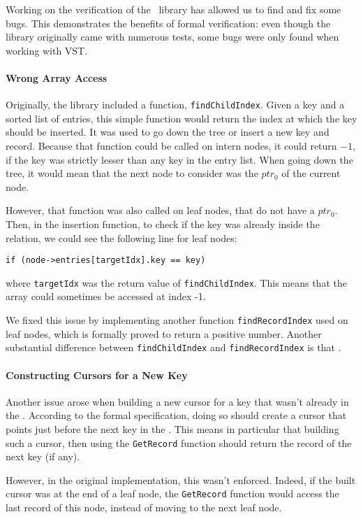 Working on the verification of the \btrees\ library has allowed us to find and fix some bugs.
This demonstrates the benefits of formal verification: even though the library originally came with numerous tests, some bugs were only found when working with VST.

\paragraph{Wrong Array Access} Originally, the library included a function, \lstinline{findChildIndex}.
Given a key and a sorted list of entries, this simple function would return the index at which the key should be inserted.
It was used to go down the tree or insert a new key and record.
Because that function could be called on intern nodes, it could return $-1$, if the key was strictly lesser than any key in the entry list.
When going down the tree, it would mean that the next node to consider was the $ptr_0$ of the current node.

However, that function was also called on leaf nodes, that do not have a $ptr_0$.
Then, in the insertion function, to check if the key was already inside the relation, we could see the following line for leaf nodes:
\begin{lstlisting}
if (node->entries[targetIdx].key == key)
\end{lstlisting}
where \lstinline{targetIdx} was the return value of \lstinline{findChildIndex}.
This means that the array could sometimes be accessed at index -1.

We fixed this issue by implementing another function \lstinline{findRecordIndex} used on leaf nodes, which is formally proved to return a positive number.
Another substantial difference between \lstinline{findChildIndex} and \lstinline{findRecordIndex} is that .

\paragraph{Constructing Cursors for a New Key}
Another issue arose when building a new cursor for a key that wasn't already in the \btree.
According to the formal specification, doing so should create a cursor that points just before the next key in the \btree.
This means in particular that building such a cursor, then using the \lstinline{GetRecord} function should return the record of the next key (if any).

However, in the original implementation, this wasn't enforced.
Indeed, if the built cursor was at the end of a leaf node, the \lstinline{GetRecord} function would access the last record of this node, instead of moving to the next leaf node.

